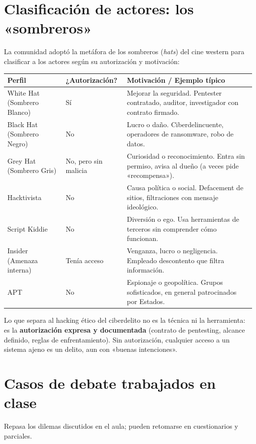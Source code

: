 \documentclass[11pt,a4paper]{article}
\begin{document}
\section{Clasificación de actores: los «sombreros»}
La comunidad adoptó la metáfora de los sombreros (\textit{hats}) del cine western para clasificar a los actores según su autorización y motivación:

\begin{center}
\renewcommand{\arraystretch}{1.35}
\begin{tabularx}{\textwidth}{@{} p{2.7cm} p{2.3cm} X @{}}
\toprule
\textbf{Perfil} & \textbf{¿Autorización?} & \textbf{Motivación / Ejemplo típico} \\
\midrule
White Hat (Sombrero Blanco) & Sí & Mejorar la seguridad. Pentester contratado, auditor, investigador con contrato firmado. \\
Black Hat (Sombrero Negro) & No & Lucro o daño. Ciberdelincuente, operadores de ransomware, robo de datos. \\
Grey Hat (Sombrero Gris) & No, pero sin malicia & Curiosidad o reconocimiento. Entra sin permiso, avisa al dueño (a veces pide «recompensa»). \\
Hacktivista & No & Causa política o social. Defacement de sitios, filtraciones con mensaje ideológico. \\
Script Kiddie & No & Diversión o ego. Usa herramientas de terceros sin comprender cómo funcionan. \\
Insider (Amenaza interna) & Tenía acceso & Venganza, lucro o negligencia. Empleado descontento que filtra información. \\
APT & No & Espionaje o geopolítica. Grupos sofisticados, en general patrocinados por Estados. \\
\bottomrule
\end{tabularx}
\end{center}

\begin{clave}
Lo que separa al hacking ético del ciberdelito no es la técnica ni la herramienta: es la \textbf{autorización expresa y documentada} (contrato de pentesting, alcance definido, reglas de enfrentamiento). Sin autorización, cualquier acceso a un sistema ajeno es un delito, aun con «buenas intenciones».
\end{clave}

\section{Casos de debate trabajados en clase}
Repasa los dilemas discutidos en el aula; pueden retomarse en cuestionarios y parciales.
\end{document}
